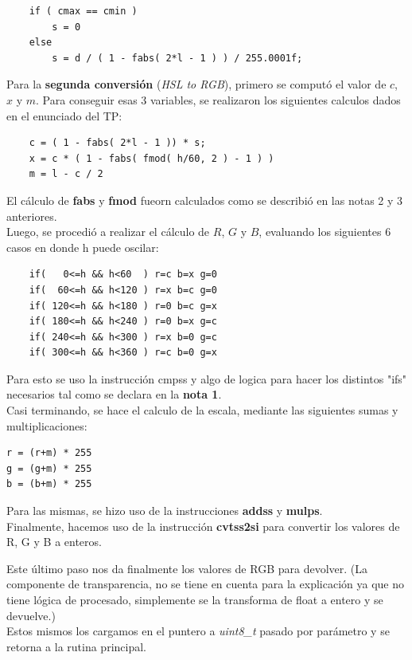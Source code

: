 \begin{verbatim}
	if ( cmax == cmin )
	    s = 0
	else
	    s = d / ( 1 - fabs( 2*l - 1 ) ) / 255.0001f;

\end{verbatim}

\newpage
Para la \textbf{segunda conversión} (\textit{HSL to RGB}), primero se computó el valor de $c$, $x$ y $m$. Para conseguir esas 3 variables, se realizaron los siguientes calculos dados en el enunciado del TP:

\begin{verbatim}
	c = ( 1 - fabs( 2*l - 1 )) * s;
	x = c * ( 1 - fabs( fmod( h/60, 2 ) - 1 ) )
	m = l - c / 2
\end{verbatim}
El cálculo de \textbf{fabs} y \textbf{fmod} fueorn calculados como se describió en las notas 2 y 3 anteriores.\\

Luego, se procedió a realizar el cálculo de $R$, $G$ y $B$, evaluando los siguientes 6 casos en donde h puede oscilar:

\begin{verbatim}
	if(   0<=h && h<60  ) r=c b=x g=0
	if(  60<=h && h<120 ) r=x b=c g=0
	if( 120<=h && h<180 ) r=0 b=c g=x
	if( 180<=h && h<240 ) r=0 b=x g=c
	if( 240<=h && h<300 ) r=x b=0 g=c
	if( 300<=h && h<360 ) r=c b=0 g=x
\end{verbatim}
Para esto se uso la instrucción cmpss y algo de logica para hacer los distintos "ifs" necesarios tal como se declara en la \textbf{nota 1}.\\


Casi terminando, se hace el calculo de la escala, mediante las siguientes sumas y multiplicaciones:
\begin{verbatim}
r = (r+m) * 255
g = (g+m) * 255
b = (b+m) * 255
\end{verbatim}
Para las mismas, se hizo uso de la instrucciones \textbf{addss} y \textbf{mulps}.\\


Finalmente, hacemos uso de la instrucción \textbf{cvtss2si} para convertir los valores de R, G y B a enteros.

Este último paso nos da finalmente los valores de RGB para devolver. (La componente de transparencia, no se tiene en cuenta para la explicación ya que no tiene lógica de procesado, simplemente se la transforma de float a entero y se devuelve.)\\
Estos mismos los cargamos en el puntero a \textit{uint8\_t} pasado por parámetro y se retorna a la rutina principal.\\

